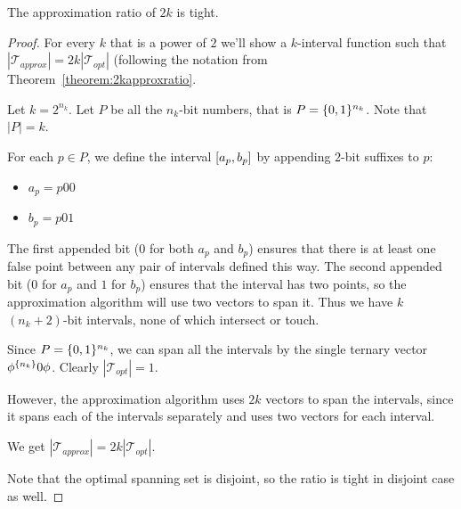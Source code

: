 \begin{theorem}
The approximation ratio of $2k$ is tight.
\end{theorem}

\begin{proof}
For every $k$ that is a power of $2$
we'll show a $k$-interval function such that
$|\mathcal{T}_{approx}| = 2k |\mathcal{T}_{opt}|$
(following the notation from
Theorem~\ref{theorem:2kapproxratio}.

Let $k = 2^{n_k}$.
Let $P$ be all the $n_k$-bit numbers,
that is $P = \{0, 1\}^{n_k}$.
Note that $|P| = k$.

For each $p \in P$,
we define the interval $[a_p, b_p]$
by appending $2$-bit suffixes to $p$:

\begin{itemize}
\item $a_p = p 0 0$
\item $b_p = p 0 1$
\end{itemize}

The first appended bit ($0$ for both $a_p$ and $b_p$)
ensures that there is at least one false point
between any pair of intervals defined this way.
The second appended bit ($0$ for $a_p$ and $1$ for $b_p$)
ensures that the interval has two points,
so the approximation algorithm will use two vectors
to span it.
Thus we have $k$ $(n_k + 2)$-bit intervals,
none of which intersect or touch.

Since $P = \{0, 1\}^{n_k}$,
we can span all the intervals by the single ternary vector
$\phi^{\{n_k\}} 0 \phi$.
Clearly $|\mathcal{T}_{opt}| = 1$.

However,
the approximation algorithm uses $2k$ vectors to span
the intervals,
since it spans each of the intervals separately
and uses two vectors for each interval.

We get
$|\mathcal{T}_{approx}| = 2k |\mathcal{T}_{opt}|$.

Note that the optimal spanning set is disjoint,
so the ratio is tight in disjoint case as well.
\end{proof}
